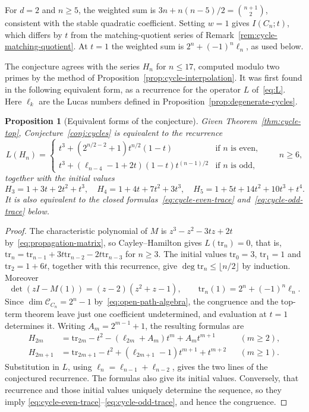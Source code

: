 \documentclass[reqno]{article}
\theoremstyle{plain} %
\newtheorem{proposition}[theorem]{Proposition}
\theoremstyle{definition}
\theoremstyle{remark}
\newcommand {\CC}{\mathscr{C}}
\numberwithin{equation}{section}
\begin{document}
For $d=2$ and $n\ge5$, the weighted sum is
$3n+n(n-5)/2=\binom{n+1}{2}$, consistent with the stable quadratic
coefficient. Setting $w=1$ gives $I(C_n;t)$, which differs by $t$ from
the matching-quotient series of Remark~\ref{rem:cycle-matching-quotient}.
At $t=1$ the weighted sum is $2^n+(-1)^n\ell_n$, as used below.

The conjecture agrees with the series $H_n$ for $n\le17$, computed
modulo two primes \cite[\texttt{cycles/}]{Cert} by the method of
Proposition~\ref{prop:cycle-interpolation}.
It was first found in the following equivalent form, as a recurrence for
the operator $L$ of~\eqref{eq:L}. Here $\ell_k$ are the Lucas numbers
defined in Proposition~\ref{prop:degenerate-cycles}.

\begin{proposition}[Equivalent forms of the conjecture]
\label{prop:cycle-reduction}
Given Theorem~\ref{thm:cycle-top}, Conjecture~\ref{conj:cycles} is
equivalent to the recurrence
\begin{equation}
    \label{eq:circ-rec}
    L(H_n)=\begin{cases}
      t^3+ (2^{n/2-2}+1)t^{n/2}(1-t) & \text{if $n$ is even},   \\
      t^3+ (\ell_{n-4}-1+2t)(1-t)t^{(n-1)/2} & \text{if $n$ is odd,}
    \end{cases}
    \qquad n\ge6,
\end{equation}
together with the initial values
\[
H_3=1+3t+2t^2+t^3, \quad
H_4=1+4t+7t^2+3t^3,  \quad
H_5=1+5t+14t^2+10t^3+t^4.
\]
It is also equivalent to the closed formulas~\eqref{eq:cycle-even-trace}
and~\eqref{eq:cycle-odd-trace} below.
\end{proposition}
\begin{proof}
The characteristic polynomial of $M$ is
$z^3-z^2-3tz+2t$ by~\eqref{eq:propagation-matrix}, so Cayley--Hamilton
gives $L(\mathrm{tr}_n)=0$, that is, $\mathrm{tr}_n=\mathrm{tr}_{n-1}+3t\mathrm{tr}_{n-2}-2t\mathrm{tr}_{n-3}$ for $n\ge3$.
The initial values $\mathrm{tr}_0=3$, $\mathrm{tr}_1=1$ and
$\mathrm{tr}_2=1+6t$, together with this recurrence, give
$\deg\mathrm{tr}_n\le\lfloor n/2\rfloor$ by induction. Moreover
\[
\det(zI-M(1))=(z-2)(z^2+z-1),\qquad
\mathrm{tr}_n(1)=2^n+(-1)^n\ell_n.
\]
Since $\dim\CC_{C_n}=2^n-1$ by~\eqref{eq:open-path-algebra},
the congruence and the top-term theorem leave just one coefficient
undetermined, and evaluation at $t=1$ determines it.
Writing $A_m=2^{m-1}+1$, the resulting formulas are
\begin{align}
H_{2m}&=\mathrm{tr}_{2m}-t^2-(\ell_{2m}+A_m)t^m+A_mt^{m+1}
 &&(m\ge2),\label{eq:cycle-even-trace}\\
H_{2m+1}&=\mathrm{tr}_{2m+1}-t^2+(\ell_{2m+1}-1)t^{m+1}+t^{m+2}
 &&(m\ge1).\label{eq:cycle-odd-trace}
\end{align}
Substitution in $L$, using $\ell_n=\ell_{n-1}+\ell_{n-2}$,
gives the two lines of the conjectured recurrence. The formulas also give
its initial values. Conversely, that recurrence and those initial values
uniquely determine the sequence, so they imply
\eqref{eq:cycle-even-trace}--\eqref{eq:cycle-odd-trace}, and hence the
congruence.
\end{proof}
\end{document}
